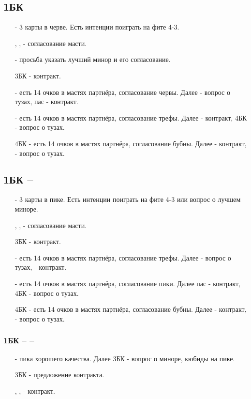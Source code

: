 \documentclass{article}
\begin{document}
\subsection{1БК -- }
\begin{enumerate}
    \item[\di{3}] - 3 карты в черве. Есть интенции поиграть  на фите 4-3.
    \item[\he{3}, \cl{4}, \di{4}] - согласование масти.
    \item[\sp{3}] - просьба указать лучший минор и его согласование. 
    \item[3БК] - контракт.
    \item[\he{4}] - есть 14 очков в мастях партнёра, согласование червы. Далее  - вопрос о тузах, пас - контракт.
    \item[\sp{4}] - есть 14 очков в мастях партнёра, согласование трефы. Далее  - контракт, 4БК - вопрос о тузах.
    \item[4БК] - есть 14 очков в мастях партнёра, согласование бубны. Далее  - контракт,  - вопрос о тузах.
\end{enumerate}
\subsection{1БК -- }
\begin{enumerate}
    \item[\he{3}] - 3 карты в пике. Есть интенции поиграть  на фите 4-3 или вопрос о лучшем миноре.
    \item[\sp{3}, \cl{4}, \di{4}] - согласование масти.
    \item[3БК] - контракт.
    \item[\he{4}] - есть 14 очков в мастях партнёра, согласование трефы. Далее  - вопрос о тузах,  - контракт.
    \item[\sp{4}] - есть 14 очков в мастях партнёра, согласование пики. Далее пас - контракт, 4БК - вопрос о тузах.
    \item[4БК] - есть 14 очков в мастях партнёра, согласование бубны. Далее  - контракт,  - вопрос о тузах.
\end{enumerate}
\subsubsection{1БК --  -- }
\begin{enumerate}
    \item[\sp{3}] - пика хорошего качества. Далее 3БК - вопрос о миноре, кюбиды на пике.
    \item[3БК] - предложение контракта.
    \item[\sp{4}, \cl{5}, \di{5}] - контракт.
\end{enumerate}
\end{document}
